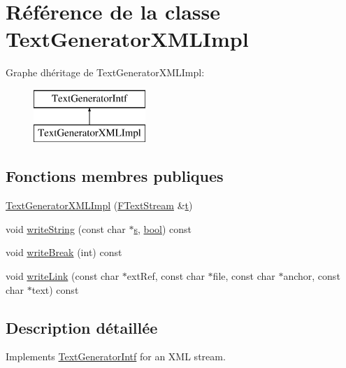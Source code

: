 \hypertarget{class_text_generator_x_m_l_impl}{}\section{Référence de la classe Text\+Generator\+X\+M\+L\+Impl}
\label{class_text_generator_x_m_l_impl}
Graphe d\textquotesingle{}héritage de Text\+Generator\+X\+M\+L\+Impl\+:\begin{figure}[H]
\begin{center}
\leavevmode
\includegraphics[height=2.000000cm]{class_text_generator_x_m_l_impl}
\end{center}
\end{figure}
\subsection*{Fonctions membres publiques}
\begin{DoxyCompactItemize}
\item 
\hyperlink{class_text_generator_x_m_l_impl_af632ddc23942a213ab212d47d61face1}{Text\+Generator\+X\+M\+L\+Impl} (\hyperlink{class_f_text_stream}{F\+Text\+Stream} \&\hyperlink{058__bracket__recursion_8tcl_a69e959f6901827e4d8271aeaa5fba0fc}{t})
\item 
void \hyperlink{class_text_generator_x_m_l_impl_a8c635c7e02a40f50f2ae1a4416daa67e}{write\+String} (const char $\ast$\hyperlink{060__command__switch_8tcl_a011c73f2dbb87635a3b4206c72355f6e}{s}, \hyperlink{qglobal_8h_a1062901a7428fdd9c7f180f5e01ea056}{bool}) const 
\item 
void \hyperlink{class_text_generator_x_m_l_impl_a3a332f937ec0e37e48f3f6fe656bb200}{write\+Break} (int) const 
\item 
void \hyperlink{class_text_generator_x_m_l_impl_aac2287968d80270761c8de6070298445}{write\+Link} (const char $\ast$ext\+Ref, const char $\ast$file, const char $\ast$anchor, const char $\ast$text) const 
\end{DoxyCompactItemize}


\subsection{Description détaillée}
Implements \hyperlink{class_text_generator_intf}{Text\+Generator\+Intf} for an X\+M\+L stream. 

